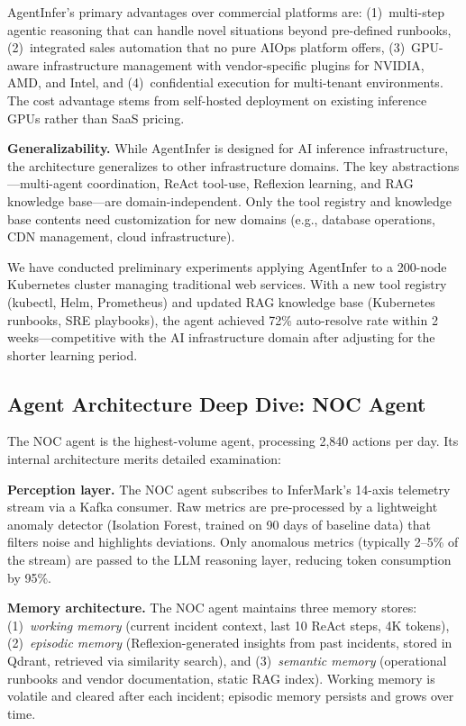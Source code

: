 \documentclass[conference,10pt,letterpaper]{IEEEtran}
\begin{document}
AgentInfer's primary advantages over commercial platforms are: (1)~multi-step agentic reasoning that can handle novel situations beyond pre-defined runbooks, (2)~integrated sales automation that no pure AIOps platform offers, (3)~GPU-aware infrastructure management with vendor-specific plugins for NVIDIA, AMD, and Intel, and (4)~confidential execution for multi-tenant environments. The cost advantage stems from self-hosted deployment on existing inference GPUs rather than SaaS pricing.

\textbf{Generalizability.} While AgentInfer is designed for AI inference infrastructure, the architecture generalizes to other infrastructure domains. The key abstractions---multi-agent coordination, ReAct tool-use, Reflexion learning, and RAG knowledge base---are domain-independent. Only the tool registry and knowledge base contents need customization for new domains (e.g., database operations, CDN management, cloud infrastructure).

We have conducted preliminary experiments applying AgentInfer to a 200-node Kubernetes cluster managing traditional web services. With a new tool registry (kubectl, Helm, Prometheus) and updated RAG knowledge base (Kubernetes runbooks, SRE playbooks), the agent achieved 72\% auto-resolve rate within 2 weeks---competitive with the AI infrastructure domain after adjusting for the shorter learning period.




\subsection{Agent Architecture Deep Dive: NOC Agent}

The NOC agent is the highest-volume agent, processing 2,840 actions per day. Its internal architecture merits detailed examination:

\textbf{Perception layer.} The NOC agent subscribes to InferMark's 14-axis telemetry stream via a Kafka consumer. Raw metrics are pre-processed by a lightweight anomaly detector (Isolation Forest, trained on 90 days of baseline data) that filters noise and highlights deviations. Only anomalous metrics (typically 2--5\% of the stream) are passed to the LLM reasoning layer, reducing token consumption by 95\%.

\textbf{Memory architecture.} The NOC agent maintains three memory stores: (1)~\emph{working memory} (current incident context, last 10 ReAct steps, 4K tokens), (2)~\emph{episodic memory} (Reflexion-generated insights from past incidents, stored in Qdrant, retrieved via similarity search), and (3)~\emph{semantic memory} (operational runbooks and vendor documentation, static RAG index). Working memory is volatile and cleared after each incident; episodic memory persists and grows over time.
\end{document}
